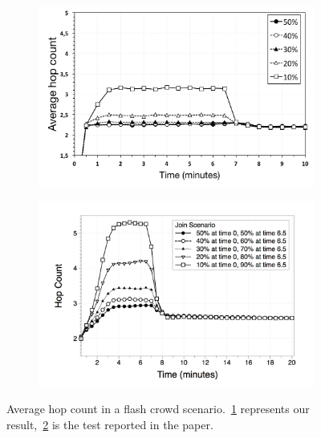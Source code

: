\documentclass{beamer}
\begin{document}
\begin{frame}
\begin{figure}
\centering
\begin{subfigure}{.5\textwidth}
  \centering
  \includegraphics[keepaspectratio=true, width=1\linewidth]{images/average_hop_count_flash_crowd_1impl}
  \caption{}
  \label{fig:average_hop_count_flash_crowd_1impl}
\end{subfigure}%
\begin{subfigure}{.5\textwidth}
  \centering
  \includegraphics[keepaspectratio=true, width=1\linewidth]{images/paper_average_hop_count_flash_crowd}
  \caption{}
  \label{fig:paper_average_hop_count_flash_crowd}
\end{subfigure}
\caption{Average hop count in a flash crowd scenario.~\ref{fig:average_hop_count_flash_crowd_1impl} represents our result,~\ref{fig:paper_average_hop_count_flash_crowd} is the test reported in the paper.}
\label{fig:robustness_hop_count_flash_crowd}
\end{figure}

\end{frame}
\end{document}
